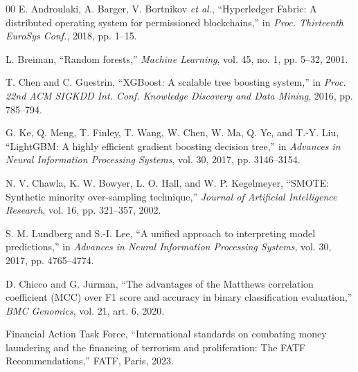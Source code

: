 \documentclass[conference]{IEEEtran}
\begin{document}
\begin{thebibliography}{00}
E. Androulaki, A. Barger, V. Bortnikov \emph{et al.}, ``Hyperledger Fabric: A
distributed operating system for permissioned blockchains,'' in \emph{Proc.
Thirteenth EuroSys Conf.}, 2018, pp. 1--15.

L. Breiman, ``Random forests,'' \emph{Machine Learning}, vol. 45, no. 1,
pp. 5--32, 2001.

T. Chen and C. Guestrin, ``XGBoost: A scalable tree boosting system,'' in
\emph{Proc. 22nd ACM SIGKDD Int. Conf. Knowledge Discovery and Data Mining},
2016, pp. 785--794.

G. Ke, Q. Meng, T. Finley, T. Wang, W. Chen, W. Ma, Q. Ye, and T.-Y. Liu,
``LightGBM: A highly efficient gradient boosting decision tree,'' in
\emph{Advances in Neural Information Processing Systems}, vol. 30, 2017,
pp. 3146--3154.

N. V. Chawla, K. W. Bowyer, L. O. Hall, and W. P. Kegelmeyer, ``SMOTE: Synthetic
minority over-sampling technique,'' \emph{Journal of Artificial Intelligence
Research}, vol. 16, pp. 321--357, 2002.

S. M. Lundberg and S.-I. Lee, ``A unified approach to interpreting model
predictions,'' in \emph{Advances in Neural Information Processing Systems},
vol. 30, 2017, pp. 4765--4774.

D. Chicco and G. Jurman, ``The advantages of the Matthews correlation
coefficient (MCC) over F1 score and accuracy in binary classification
evaluation,'' \emph{BMC Genomics}, vol. 21, art. 6, 2020.

Financial Action Task Force, ``International standards on combating money
laundering and the financing of terrorism and proliferation: The FATF
Recommendations,'' FATF, Paris, 2023.

\end{thebibliography}
\end{document}
